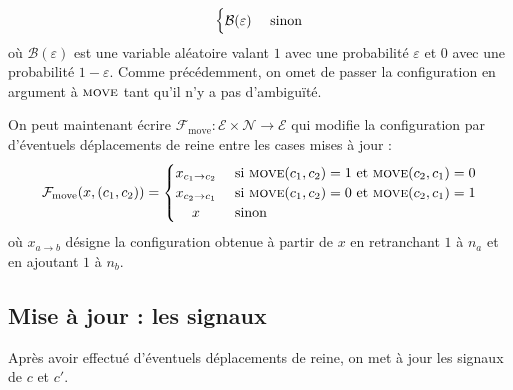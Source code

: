 \documentclass[11pt, openany]{article}
\newcommand{\Ne}{\mathcal{N}}
\newcommand{\M}{\textsc{move}}
\newcommand{\E}{\mathcal{E}}
\begin{document}
\begin{itemize}
{\[\begin{cases}
      \hfill \mathcal{B}(\varepsilon)\hfill  & \text{ sinon} \\
    \end{cases}
\]
où $\mathcal{B}(\varepsilon)$ est une variable aléatoire valant $1$ avec une probabilité $\varepsilon$ et $0$ avec une probabilité $1-\varepsilon$. Comme précédemment, on omet de passer la configuration en argument à $\M$ tant qu'il n'y a pas d'ambiguïté.
}


\end{itemize}

\medskip

On peut maintenant écrire $\mathcal{F}_{\mathrm{move}} : \E\times\Ne\to\E$ qui modifie la configuration par d'éventuels déplacements de reine entre les cases mises à jour :  \[
\mathcal{F}_{\mathrm{move}}(x,(c_1, c_2)) = 
\begin{cases}
  \hfill x_{c_1\to c_2} \hfill & \text{ si $\M(c_1, c_2) = 1$ et $\M(c_2, c_1) = 0$} \\
  \hfill x_{c_2 \to c_1} \hfill & \text{ si $\M(c_1, c_2) = 0$ et $\M(c_2, c_1) = 1$} \\
  \hfill x \hfill & \text{ sinon} \\
  \end{cases}
\]
où $x_{a \to b}$ désigne la configuration obtenue à partir de $x$ en retranchant $1$ à $n_{a}$ et en ajoutant $1$ à $n_{b}$. 

\medskip



\subsection*{Mise à jour : les signaux}  

Après avoir effectué d'éventuels déplacements de reine, on met à jour les signaux de $c$ et $c'$. 
\end{document}
